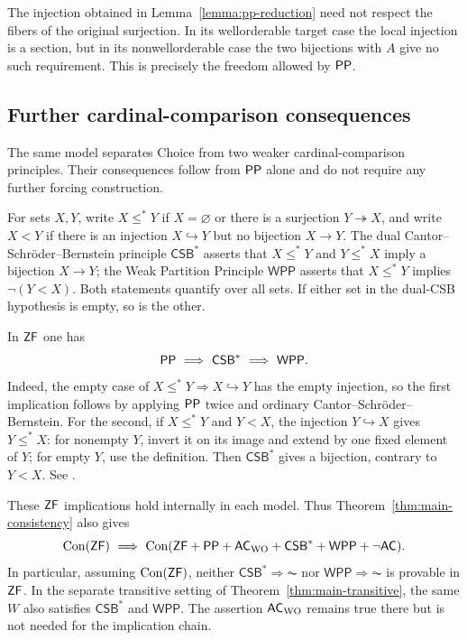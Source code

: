 The injection obtained in Lemma~\ref{lemma:pp-reduction} need not
respect the fibers of the original surjection.  In its wellorderable
target case the local injection is a section, but in its
nonwellorderable case the two bijections with $A$ give no such
requirement.  This is precisely the freedom allowed by $\mathsf{PP}$.

\subsection{Further cardinal-comparison consequences}

The same model separates Choice from two weaker cardinal-comparison
principles. Their consequences follow from $\mathsf{PP}$ alone and do not
require any further forcing construction.

\begin{remark}\label{rem:dual-csb-wpp}
For sets $X,Y$, write $X\leq^{*}Y$ if $X=\varnothing$ or there is a
surjection $Y\twoheadrightarrow X$, and write $X<Y$ if there is an
injection $X\hookrightarrow Y$ but no bijection $X\to Y$. The dual
Cantor--Schr\"oder--Bernstein principle $\mathsf{CSB}^{*}$ asserts that
$X\leq^{*}Y$ and $Y\leq^{*}X$ imply a bijection $X\to Y$; the Weak
Partition Principle $\mathsf{WPP}$ asserts that $X\leq^{*}Y$ implies
$\neg(Y<X)$. Both statements quantify over all sets. If either set in
the dual-CSB hypothesis is empty, so is the other.

In $\mathsf{ZF}$ one has
\[
 \PP\ \Longrightarrow\ \mathsf{CSB}^{*}\ \Longrightarrow\ \mathsf{WPP}.
\]
Indeed, the empty case of $X\leq^{*}Y\Rightarrow X\hookrightarrow Y$
has the empty injection, so the first implication follows by applying
$\mathsf{PP}$ twice and ordinary Cantor--Schr\"oder--Bernstein. For the second,
if $X\leq^{*}Y$ and $Y<X$, the injection $Y\hookrightarrow X$ gives
$Y\leq^{*}X$: for nonempty $Y$, invert it on its image and extend by
one fixed element of $Y$; for empty $Y$, use the definition. Then
$\mathsf{CSB}^{*}$ gives a bijection, contrary to $Y<X$. See
\cite[Definitions~2.1--2.2, Proposition~2.3, and the proofs of
Corollary~8.2 and Proposition~9.8]{BlassKulshreshtha2026}.

These $\mathsf{ZF}$ implications hold internally in each model. Thus
Theorem~\ref{thm:main-consistency} also gives
\[
 \operatorname{Con}(\mathsf{ZF})\ \Longrightarrow\
 \operatorname{Con}(\mathsf{ZF}+\mathsf{PP}+\mathsf{AC}_{\mathrm{WO}}+\mathsf{CSB}^{*}+\mathsf{WPP}+\neg\mathsf{AC}).
\]
In particular, assuming $\operatorname{Con}(\mathsf{ZF})$, neither
$\mathsf{CSB}^{*}\Rightarrow\AC$ nor $\mathsf{WPP}\Rightarrow\AC$ is
provable in $\mathsf{ZF}$. In the separate transitive setting of
Theorem~\ref{thm:main-transitive}, the same $W$ also satisfies
$\mathsf{CSB}^{*}$ and $\mathsf{WPP}$. The assertion $\mathsf{AC}_{\mathrm{WO}}$ remains
true there but is not needed for the implication chain.
\end{remark}

